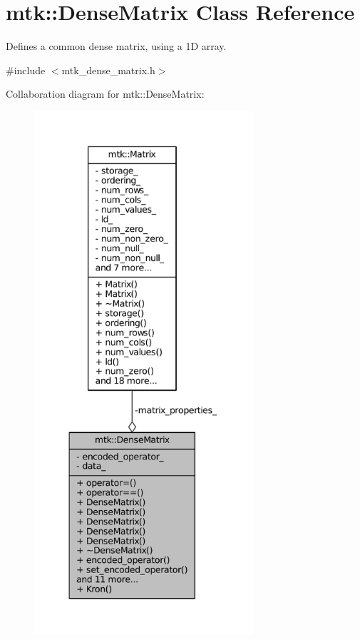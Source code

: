 \hypertarget{classmtk_1_1DenseMatrix}{\section{mtk\+:\+:Dense\+Matrix Class Reference}
\label{classmtk_1_1DenseMatrix}
}


Defines a common dense matrix, using a 1\+D array.  




{\ttfamily \#include $<$mtk\+\_\+dense\+\_\+matrix.\+h$>$}



Collaboration diagram for mtk\+:\+:Dense\+Matrix\+:
\nopagebreak
\begin{figure}[H]
\begin{center}
\leavevmode
\includegraphics[height=550pt]{classmtk_1_1DenseMatrix__coll__graph}
\end{center}
\end{figure}
